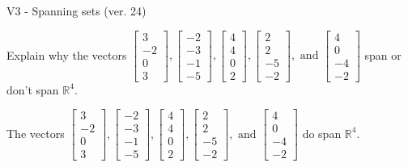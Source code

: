 \begin{exercise}
  \begin{exerciseTitle}V3 - Spanning sets (ver. 24)\end{exerciseTitle}
  \begin{exerciseStatement}
    Explain why the vectors \(\left[\begin{array}{r}
3 \\
-2 \\
0 \\
3
\end{array}\right] , \left[\begin{array}{r}
-2 \\
-3 \\
-1 \\
-5
\end{array}\right] , \left[\begin{array}{r}
4 \\
4 \\
0 \\
2
\end{array}\right] , \left[\begin{array}{r}
2 \\
2 \\
-5 \\
-2
\end{array}\right] , \text{ and } \left[\begin{array}{r}
4 \\
0 \\
-4 \\
-2
\end{array}\right]\) span or don't span \(\mathbb{R}^4\). 
	


  \end{exerciseStatement}
  \begin{exerciseAnswer}
   The vectors \(\left[\begin{array}{r}
3 \\
-2 \\
0 \\
3
\end{array}\right] , \left[\begin{array}{r}
-2 \\
-3 \\
-1 \\
-5
\end{array}\right] , \left[\begin{array}{r}
4 \\
4 \\
0 \\
2
\end{array}\right] , \left[\begin{array}{r}
2 \\
2 \\
-5 \\
-2
\end{array}\right] , \text{ and } \left[\begin{array}{r}
4 \\
0 \\
-4 \\
-2
\end{array}\right]\) 
  	 do  
	span \(\mathbb{R}^4\).
  



\end{exerciseAnswer}
\end{exercise}

